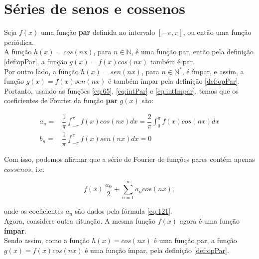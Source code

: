 \chapter{Séries de senos e cossenos}

    Seja $f(x)$ uma função \textbf{par} definida no intervalo $[-\pi,\pi]$, ou então
    uma função periódica.\\
    
    A função $h(x) = cos(nx)$, para $n \in \mathbb{N}$, é uma 
    função par, então pela definição \ref{def:opPar}, a função $g(x) = f(x)cos(nx)$ 
    também é par.\\
    
    Por outro lado, a função $h(x) = sen(nx)$, para $n \in \mathbb{N}^*$,
    é ímpar, e assim, a função $g(x) = f(x)sen(nx)$ é também ímpar pela definição 
    \ref{def:opPar}.\\

    Portanto, usando as funções \ref{eq:65}, \ref{eq:intPar} e \ref{eq:intImpar}, temos 
    que os coeficientes de Fourier da função \textbf{par} $g(x)$ são:

    \begin{equation}
    \label{eq:121}
        \begin{split}
            a_n = &\dfrac{1}{\pi}\int_{-\pi}^{\pi}f(x)cos(nx) dx = \dfrac{2}{\pi}\int_{0}^{\pi} f(x)cos(nx) dx \\
            b_n = &\dfrac{1}{\pi}\int_{-\pi}^{\pi}f(x)sen(nx) dx = 0
        \end{split}
    \end{equation}

    Com isso, podemos afirmar que a série de Fourier de funções pares contém apenas $cossenos$, i.e.

    \begin{equation}
        f(x) ~ \dfrac{a_0}{2} + \sum\limits_{n=1}^{\infty}a_n cos(nx),
    \end{equation}

    onde os coeficientes $a_n$ são dados pela fórmula \ref{eq:121}.\\

    Agora, considere outra situação. A mesma função $f(x)$ agora é uma função \textbf{ímpar}.\\

    Sendo assim, como a função $h(x) = cos(nx)$ é uma função par, a função $g(x) = f(x)cos(nx)$
    é uma função ímpar, pela definição \ref{def:opPar}.\\
    
